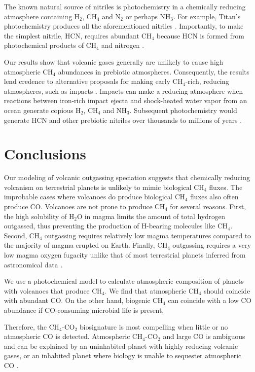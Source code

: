 The known natural source of nitriles is photochemistry in a chemically reducing atmosphere containing H$_2$, CH$_4$ and N$_2$ or perhaps NH$_3$. For example, Titan's photochemistry produces all the aforementioned nitriles \citep{Strobel_2009}. Importantly, to make the simplest nitrile, HCN, requires abundant CH$_4$ because HCN is formed from photochemical products of CH$_4$ and nitrogen \citep{Zahnle_1986,Tian_2011}.

Our results show that volcanic gases generally are unlikely to cause high atmospheric CH$_4$ abundances in prebiotic atmospheres. Consequently, the results lend credence to alternative proposals for making early CH$_4$-rich, reducing atmospheres, such as impacts \citep{Zahnle_2020}. Impacts can make a reducing atmosphere when reactions between iron-rich impact ejecta and shock-heated water vapor from an ocean generate copious H$_2$, CH$_4$ and NH$_3$. Subsequent photochemistry would generate HCN and other prebiotic nitriles over thousands to millions of years \citep{Zahnle_2020}.

\section{Conclusions}

Our modeling of volcanic outgassing speciation suggests that chemically reducing volcanism on terrestrial planets is unlikely to mimic biological CH$_4$ fluxes. The improbable cases where volcanoes do produce biological CH$_4$ fluxes also often produce CO. Volcanoes are not prone to produce CH$_4$ for several reasons. First, the high solubility of H$_2$O in magma limits the amount of total hydrogen outgassed, thus preventing the production of H-bearing molecules like CH$_4$. Second, CH$_4$ outgassing requires relatively low magma temperatures compared to the majority of magma erupted on Earth. Finally, CH$_4$ outgassing requires a very low magma oxygen fugacity unlike that of most terrestrial planets inferred from astronomical data \citep{Doyle_2019}.

We use a photochemical model to calculate atmospheric composition of planets with volcanoes that produce CH$_4$. We find that atmospheric CH$_4$ should coincide with abundant CO. On the other hand, biogenic CH$_4$ can coincide with a low CO abundance if CO-consuming microbial life is present.

Therefore, the CH$_4$-CO$_2$ biosignature is most compelling when little or no atmospheric CO is detected. Atmospheric CH$_4$-CO$_2$ and large CO is ambiguous and can be explained by an uninhabited planet with highly reducing volcanic gases, or an inhabited planet where biology is unable to sequester atmospheric CO \citep{Schwieterman_2019}.

